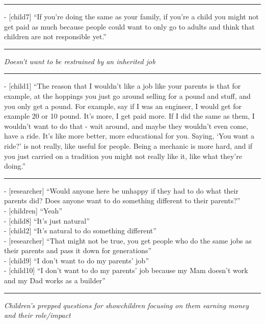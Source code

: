 {\centering
  \noindent\rule{0.5\textwidth}{0.4pt}\par
}

- [child7] “If you’re doing the same as your family, if you’re a child you might not get paid as much because people could want to only go to adults and think that children are not responsible yet.”  

\par\noindent\rule{\textwidth}{1pt}

\textit{Doesn’t want to be restrained by an inherited job}

\par\noindent\rule{\textwidth}{1pt}

- [child1] “The reason that I wouldn’t like a job like your parents is that for example, at the hoppings you just go around selling for a pound and stuff, and you only get a pound. For example, say if I was an engineer, I would get for example 20 or 10 pound. It’s more, I get paid more. If I did the same as them, I wouldn’t want to do that - wait around, and maybe they wouldn’t even come, have a ride. It’s like more better, more educational for you. Saying, ‘You want a ride?’ is not really, like useful for people. Being a mechanic is more hard, and if you just carried on a tradition you might not really like it, like what they’re doing.”\\

{\centering
  \noindent\rule{0.5\textwidth}{0.4pt}\par
}

- [researcher] “Would anyone here be unhappy if they had to do what their parents did? Does anyone want to do something different to their parents?”\\
- [children] “Yeah”\\
- [child8] “It’s just natural”\\
- [child2] “It’s natural to do something different”\\
- [researcher] “That might not be true, you get people who do the same jobs as their parents and pass it down for generations”\\
- [child9] “I don’t want to do my parents’ job”\\
- [child10] “I don’t want to do my parents’ job because my Mam doesn’t work and my Dad works as a builder”\\

\par\noindent\rule{\textwidth}{1pt}

\textit{Children’s prepped questions for showchildren focusing on them earning money and their role/impact}

